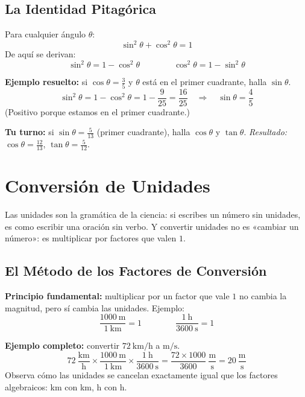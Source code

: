 \documentclass[12pt, letterpaper]{article}
\begin{document}
\subsection{La Identidad Pitagórica}

\begin{cuadroteoria}
  Para cualquier ángulo $\theta$:
  \[
    \sin^2\theta + \cos^2\theta = 1
  \]
  De aquí se derivan:
  \[
    \sin^2\theta = 1 - \cos^2\theta \qquad\qquad \cos^2\theta = 1 - \sin^2\theta
  \]
\end{cuadroteoria}

\begin{cuadropasos}
  \textbf{Ejemplo resuelto:} si $\cos\theta = \frac{3}{5}$ y $\theta$ está en el primer cuadrante, halla $\sin\theta$.
  \[
    \sin^2\theta = 1 - \cos^2\theta = 1 - \frac{9}{25} = \frac{16}{25}
    \quad\Rightarrow\quad \sin\theta = \frac{4}{5}
  \]
  (Positivo porque estamos en el primer cuadrante.)
\end{cuadropasos}

\noindent\textbf{Tu turno:} si $\sin\theta = \frac{5}{13}$ (primer cuadrante), halla $\cos\theta$ y $\tan\theta$. \emph{Resultado:} $\cos\theta = \frac{12}{13}$, $\tan\theta = \frac{5}{12}$.


\section{Conversión de Unidades}

Las unidades son la gramática de la ciencia: si escribes un número sin unidades, es como escribir una oración sin verbo. Y convertir unidades no es «cambiar un número»: es multiplicar por factores que valen $1$.

\subsection{El Método de los Factores de Conversión}

\begin{cuadroteoria}
  \textbf{Principio fundamental:} multiplicar por un factor que vale $1$ no cambia la magnitud, pero sí cambia las unidades. Ejemplo:
  \[
    \frac{1000\ \text{m}}{1\ \text{km}} = 1 \qquad\qquad
    \frac{1\ \text{h}}{3600\ \text{s}} = 1
  \]
\end{cuadroteoria}

\begin{cuadropasos}
  \textbf{Ejemplo completo:} convertir $72\ \text{km/h}$ a $\text{m/s}$.
  \[
    72\ \frac{\text{km}}{\text{h}}
    \times \frac{1000\ \text{m}}{1\ \text{km}}
    \times \frac{1\ \text{h}}{3600\ \text{s}}
    = \frac{72 \times 1000}{3600}\ \frac{\text{m}}{\text{s}}
    = 20\ \frac{\text{m}}{\text{s}}
  \]
  Observa cómo las unidades se cancelan exactamente igual que los factores algebraicos: km con km, h con h.
\end{cuadropasos}
\end{document}
